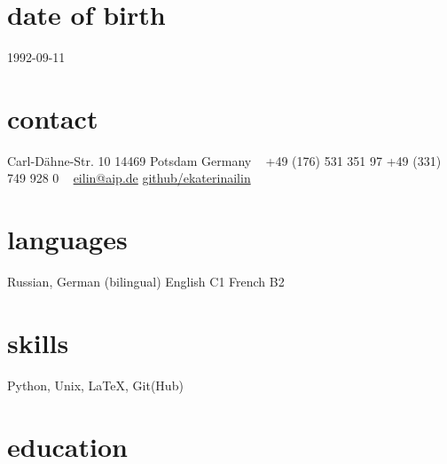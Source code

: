 \documentclass[]{k-cv} %
\begin{document}


\begin{aside} %
\section{date of birth}
\color{gray}1992-09-11
\section{contact}
Carl-D\"ahne-Str. 10
14469 Potsdam
Germany
~
+49 (176) 531 351 97
+49 (331) 749 928 0
~
\href{mailto:eilin@aip.de}{eilin@aip.de}
\href{https://github.com/ekaterinailin}{github/ekaterinailin}
\section{languages}
Russian, German (bilingual)
English C1
French B2
\section{skills}
Python, Unix, LaTeX, Git(Hub)
\end{aside}


\section{education}
\end{document}
